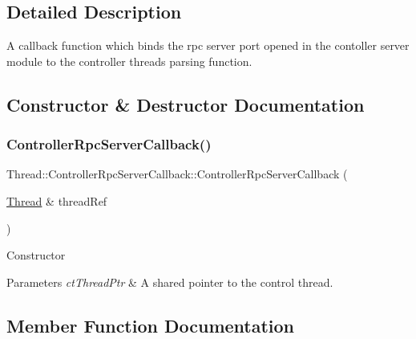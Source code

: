 \subsection{Detailed Description}
A callback function which binds the rpc server port opened in the contoller server module to the controller thread\textquotesingle{}s parsing function. 

\subsection{Constructor \& Destructor Documentation}
\hypertarget{classThread_1_1ControllerRpcServerCallback_ad836e4cdaafc42ad309b5248ef38c280}{}\label{classThread_1_1ControllerRpcServerCallback_ad836e4cdaafc42ad309b5248ef38c280} 
\subsubsection{\texorpdfstring{Controller\+Rpc\+Server\+Callback()}{ControllerRpcServerCallback()}}
{\footnotesize\ttfamily Thread\+::\+Controller\+Rpc\+Server\+Callback\+::\+Controller\+Rpc\+Server\+Callback (\begin{DoxyParamCaption}\item[{\hyperlink{classThread}{Thread} \&}]{thread\+Ref }\end{DoxyParamCaption})}

Constructor 
\begin{DoxyParams}{Parameters}
{\em ct\+Thread\+Ptr} & A shared pointer to the control thread. \\
\hline
\end{DoxyParams}


\subsection{Member Function Documentation}
\hypertarget{classThread_1_1ControllerRpcServerCallback_a61f5510543f1bb96793dceca13eb6865}{}\label{classThread_1_1ControllerRpcServerCallback_a61f5510543f1bb96793dceca13eb6865} 
